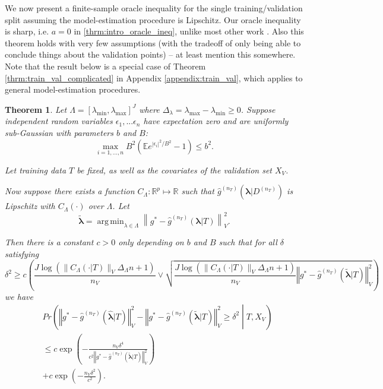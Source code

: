 \documentclass[12pt]{article} %
\newtheorem{theorem}{Theorem}
\theoremstyle{definition}
\DeclareMathOperator*{\argmin}{arg\,min}
\begin{document}
We now present a finite-sample oracle inequality for the single training/validation split assuming the model-estimation procedure is Lipschitz. Our oracle inequality is sharp, i.e. $a=0$ in \eqref{thrm:intro_oracle_ineq}, unlike most other work \citep{gyorfi2006distribution, lecue2012oracle, van2003unified}.
Also this theorem holds with very few assumptions (with the tradeoff of only being able to conclude things about the validation points) -- at least mention this somewhere.
Note that the result below is a special case of Theorem \ref{thrm:train_val_complicated} in Appendix \ref{appendix:train_val}, which applies to general model-estimation procedures.
\begin{theorem}
	\label{thrm:train_val}
	Let $\Lambda=[\lambda_{\min},\lambda_{\max}]^{J}$ where $\Delta_{\lambda} = \lambda_{\max} - \lambda_{\min} \ge 0$.
	Suppose independent random variables $\epsilon_1, ... \epsilon_n$ have expectation zero and are uniformly sub-Gaussian with parameters $b$ and $B$:
	$$
	\max_{i=1,...,n} B^2 \left ( \mathbb{E} e^{|\epsilon_i|^2/B^2} - 1 \right ) \le b^2.
	$$
	
	Let training data $T$ be fixed, as well as the covariates of the validation set $X_V$.
	
	Now suppose there exists a function $C_\Lambda: \mathbb{R}^p \mapsto \mathbb{R}$ such that $\hat g^{(n_T)}(\boldsymbol{\lambda} |D^{(n_T)})$ is Lipschitz with $C_\Lambda(\cdot)$ over $\Lambda$.
	Let
	\begin{equation}
	\tilde{\boldsymbol \lambda} = \argmin_{\lambda \in \Lambda} \left \| g^*-\hat{g}^{(n_T)}( \boldsymbol{\lambda} | T) \right \|_{V}^{2}.
	\label{eq:tilde_lambda_def}
	\end{equation}
	
	Then there is a constant $c>0$ only depending on $b$ and $B$ such that for all $\delta$ satisfying
	\begin{equation}
	\delta^{2}
	\ge
	c \left (
	\frac{J \log(\|C_\Lambda(\cdot |T)\|_V \Delta_{\Lambda} n + 1)}{n_{V}}
	\vee 
	\sqrt{\frac{J \log(\|C_\Lambda(\cdot |T)\|_V \Delta_{\Lambda} n + 1)}{n_{V}}\left\Vert g^* - \hat{g}^{(n_T)}( \tilde{\boldsymbol{\lambda}} | T)\right\Vert_{V}^2}
	\right )
	\label{thrm:train_val_delta}
	\end{equation}
	we have
	\begin{align}
	& Pr\left(
	\left\Vert g^* - \hat{g}^{(n_T)}( \hat{\boldsymbol{\lambda}} | T) \right\Vert _{V}^2 -
	\left\Vert g^* - \hat{g}^{(n_T)}( \tilde{\boldsymbol{\lambda}} | T) \right\Vert _{V}^2
	\ge\delta^2
	\middle | 
	T, X_V
	\right )\\
	&\le c\exp\left(-\frac{n_{V}\delta^{4}}{
		c^{2}
		\left\Vert g^* - \hat{g}^{(n_T)}( \tilde{\boldsymbol{\lambda}} | T) \right\Vert _{V}^2
	}\right) \\
	& +c\exp\left(-\frac{n_{V}\delta^{2}}{c^{2}}\right).
	\end{align}
	
\end{theorem}
\end{document}
